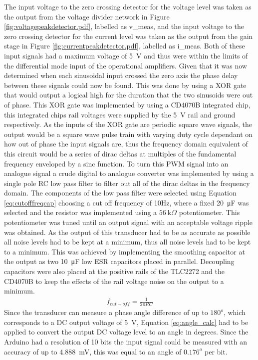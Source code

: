 The input voltage to the zero crossing detector for the voltage level was taken as the output from the voltage divider network in Figure \ref{fig:voltagepeakdetector.pdf}, labelled as v\_{meas}, and the input voltage to the zero crossing detector for the current level was taken as the output from the gain stage in Figure \ref{fig:currentpeakdetector.pdf}, labelled as i\_{meas}. Both of these input signals had a maximum voltage of \SI{5}{\volt} and thus were within the limits of the differential mode input of the operational amplifiers. Given that it was now determined when each sinusoidal input crossed the zero axis the phase delay between these signals could now be found. This was done by using a XOR gate that would output a logical high for the duration that the two sinusoids were out of phase. This XOR gate was implemented by using a CD4070B integrated chip, this integrated chips rail voltages were supplied by the \SI{5}{\volt} rail and ground respectively. \vspace{4mm} \newline
As the inputs of the XOR gate are periodic square wave signals, the output would be a square wave pulse train with varying duty cycle dependant on how out of phase the input signals are, thus the frequency domain equivalent of this circuit would be a series of dirac deltas at multiples of the fundamental frequency enveloped by a sinc function. To turn this PWM signal into an analogue signal a crude digital to analogue converter was implemented by using a single pole RC low pass filter to filter out all of the dirac deltas in the frequency domain. The components of the low pass filter were selected using Equation \ref{eq:cutofffreqcap} choosing a cut off frequency of 10Hz, where a fixed \SI{20}{\micro F} was selected and the resistor was implemented using a $\SI{56}{\kilo \Omega}$ potentiometer. This potentiometer was tuned until an output signal with an acceptable voltage ripple was obtained. As the output of this transducer had to be as accurate as possible all noise levels had to be kept at a minimum, thus all noise levels had to be kept to a minimum. This was achieved by implementing the smoothing capacitor at the output as two \SI{10}{\micro F} low ESR capacitors placed in parallel. Decoupling capacitors were also placed at the positive rails of the TLC2272 and the CD4070B  to keep the effects of the rail voltage noise on the output to a minimum.
\begin{align}
    f_{cut-off}=\frac{1}{2\pi RC} 
   \label{eq:cutofffreqcap}
\end{align}
Since the transducer can measure a phase angle difference of up to $180^o$, which corresponds to a DC output voltage of \SI{5}{\volt}, Equation \ref{eq:angle_calc} had to be applied to convert the output DC voltage level to an angle in degrees. Since the Arduino had a resolution of 10 bits the input signal could be measured with an accuracy of up to \SI{4.888}{\milli V}, this was equal to an angle of $0.176^o$ per bit.

